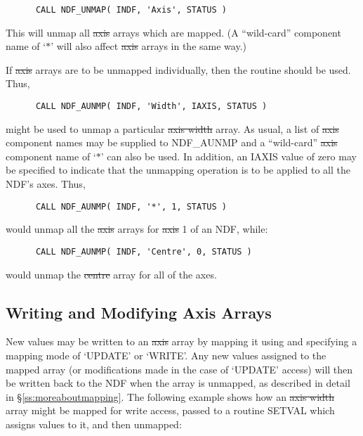 \small
\begin{verbatim}
      CALL NDF_UNMAP( INDF, 'Axis', STATUS )
\end{verbatim}
\normalsize

This will unmap all \st{axis\/} arrays which are mapped.
(A ``wild-card'' component name of `$*$' will also affect \st{axis\/}
arrays in the same way.)

If \st{axis\/} arrays are to be unmapped individually, then the routine
 should be used. 
Thus,

\small
\begin{verbatim}
      CALL NDF_AUNMP( INDF, 'Width', IAXIS, STATUS )
\end{verbatim}
\normalsize

might be used to unmap a particular \st{axis width\/} array.
As usual, a list of \st{axis\/} component names may be supplied to
NDF\_AUNMP and a ``wild-card'' \st{axis\/} component name of `$*$' can also be
used. 
In addition, an IAXIS value of zero may be specified to indicate that the
unmapping operation is to be applied to all the NDF's axes. 
Thus,

\small
\begin{verbatim}
      CALL NDF_AUNMP( INDF, '*', 1, STATUS )
\end{verbatim}
\normalsize

would unmap all the \st{axis\/} arrays for \st{axis\/} 1 of an NDF, while:

\small
\begin{verbatim}
      CALL NDF_AUNMP( INDF, 'Centre', 0, STATUS )
\end{verbatim}
\normalsize

would unmap the \st{centre\/} array for all of the axes.

\subsection{Writing and Modifying Axis Arrays}

New values may be written to an \st{axis\/} array by mapping it using
 and specifying a mapping mode of `UPDATE' or `WRITE'. 
Any new values assigned to the mapped array (or modifications made in the
case of `UPDATE' access) will then be written back to the NDF when the array
is unmapped, as described in detail in \S\ref{ss:moreaboutmapping}. 
The following example shows how an \st{axis width\/} array might be mapped
for write access, passed to a routine SETVAL which assigns values to it, and
then unmapped: 


